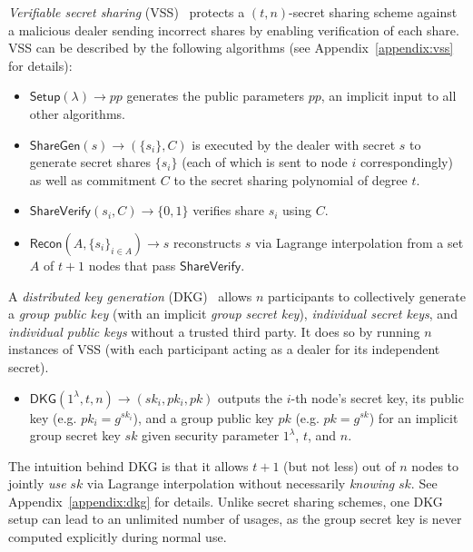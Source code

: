 \begin{definition}
\textit{Verifiable secret sharing} (VSS)~\cite{feldman1987practical, pedersen1991non} protects a $(t, n)$-secret sharing scheme against a malicious dealer sending incorrect shares by enabling verification of each share. VSS can be described by the following algorithms (see Appendix~\ref{appendix:vss} for details):
\begin{itemize}
    \item $\mathsf{Setup}(\lambda) \rightarrow pp$ generates the public parameters $pp$, an implicit input to all other algorithms.
    \item $\mathsf{ShareGen}(s) \rightarrow (\{s_i\}, C)$ is executed by the dealer with secret $s$ to generate secret shares $\{s_i\}$ (each of which is sent to node $i$ correspondingly) as well as commitment $C$ to the secret sharing polynomial of degree $t$.
    \item $\mathsf{ShareVerify}(s_i, C) \rightarrow \{0, 1\}$ verifies share $s_i$ using $C$.
    \item $\mathsf{Recon}(A, \{s_i\}_{i \in A}) \rightarrow s$ reconstructs $s$ via Lagrange interpolation from a set $A$ of $t + 1$ nodes that pass $\mathsf{ShareVerify}$.
\end{itemize}

\end{definition}

\begin{definition}
\label{def:dkg}
A \textit{distributed key generation} (DKG)~\cite{pedersen1991threshold,gennaro1999secure} allows $n$ participants to collectively generate a \textit{group public key} (with an implicit \textit{group secret key}), \textit{individual secret keys}, and \textit{individual public keys} without a trusted third party. It does so by running $n$ instances of VSS (with each participant acting as a dealer for its independent secret).
\begin{itemize}
    \item $\mathsf{DKG}(1^\lambda, t, n) \rightarrow (sk_i, pk_i, pk)$ outputs the $i$-th node's secret key, its public key (e.g. $pk_i = g^{sk_i}$), and a group public key $pk$ (e.g. $pk = g^{sk}$) for an implicit group secret key $sk$ given security parameter $1^\lambda$, $t$, and $n$.
\end{itemize}
The intuition behind DKG is that it allows $t + 1$ (but not less) out of $n$ nodes to jointly \textit{use} $sk$ via Lagrange interpolation without necessarily \textit{knowing} $sk$. See Appendix~\ref{appendix:dkg} for details.
Unlike secret sharing schemes, one DKG setup can lead to an unlimited number of usages, as the group secret key is never computed explicitly during normal use.
\end{definition}

